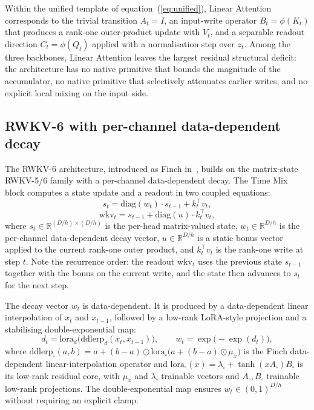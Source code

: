Within the unified template of equation~(\ref{eq:unified}), Linear
Attention corresponds to the trivial transition $A_{t} = I$, an
input-write operator $B_{t} = \phi(K_{t})$ that produces a rank-one
outer-product update with $V_{t}$, and a separable readout direction
$C_{t} = \phi(Q_{t})$ applied with a normalisation step over $z_{t}$.
Among the three backbones, Linear Attention leaves the largest
residual structural deficit: the architecture has no native primitive
that bounds the magnitude of the accumulator, no native primitive
that selectively attenuates earlier writes, and no explicit local
mixing on the input side.

\subsection{RWKV-6 with per-channel data-dependent decay}\label{sec:backbones:rwkv6}

The RWKV-6 architecture, introduced as Finch
in~\citet{peng2024eaglefinch}, builds on the matrix-state RWKV-5/6
family with a per-channel data-dependent decay. The Time Mix block
computes a state update and a readout in two coupled equations:
\begin{equation}\label{eq:rwkv6-state}
s_{t} = \mathrm{diag}(w_{t}) \cdot s_{t-1} + k_{t}^{\top} v_{t},
\end{equation}
\begin{equation}\label{eq:rwkv6-readout}
\mathrm{wkv}_{t} = s_{t-1} + \mathrm{diag}(u) \cdot k_{t}^{\top} v_{t},
\end{equation}
where $s_{t} \in \mathbb{R}^{(D/h) \times (D/h)}$ is the per-head
matrix-valued state, $w_{t} \in \mathbb{R}^{D/h}$ is the per-channel
data-dependent decay vector, $u \in \mathbb{R}^{D/h}$ is a static
bonus vector applied to the current rank-one outer product, and
$k_{t}^{\top} v_{t}$ is the rank-one write at step $t$. Note the
recurrence order: the readout $\mathrm{wkv}_{t}$ uses the previous
state $s_{t-1}$ together with the bonus on the current write, and the
state then advances to $s_{t}$ for the next step.

The decay vector $w_{t}$ is data-dependent. It is produced by a
data-dependent linear interpolation of $x_{t}$ and $x_{t-1}$,
followed by a low-rank LoRA-style projection and a stabilising
double-exponential map:
\begin{equation}\label{eq:rwkv6-decay}
d_{t} = \mathrm{lora}_{d}\!\big(\mathrm{ddlerp}_{d}(x_{t}, x_{t-1})\big),
\qquad w_{t} = \exp\!\big({-}\exp(d_{t})\big),
\end{equation}
where $\mathrm{ddlerp}_{\square}(a, b) = a + (b - a) \odot \mathrm{lora}_{\square}\!\big(a + (b - a) \odot \mu_{x}\big)$
is the Finch data-dependent linear-interpolation operator and
$\mathrm{lora}_{\square}(x) = \lambda_{\square} + \tanh(x A_{\square}) B_{\square}$
is its low-rank residual core, with $\mu_{x}$ and $\lambda_{\square}$
trainable vectors and $A_{\square}, B_{\square}$ trainable low-rank
projections. The double-exponential map ensures $w_{t} \in (0, 1)^{D/h}$
without requiring an explicit clamp.

